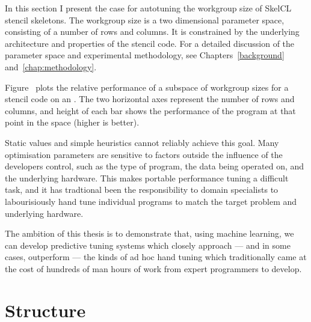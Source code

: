 In this section I present the case for autotuning the workgroup size
of SkelCL stencil skeletons. The workgroup size is a two dimensional
parameter space, consisting of a number of rows and columns. It is
constrained by the underlying architecture and properties of the
stencil code. For a detailed discussion of the parameter space and
experimental methodology, see Chapters~\ref{background}
and~\ref{chap:methodology}.

Figure~\TODO{} plots the relative performance of a subspace of
workgroup sizes for a stencil code on an \TODO{}. The two horizontal
axes represent the number of rows and columns, and height of each bar
shows the performance of the program at that point in the space
(higher is better).



Static values and simple heuristics cannot reliably achieve this
goal. Many optimisation parameters are sensitive to factors outside
the influence of the developers control, such as the type of program,
the data being operated on, and the underlying hardware. This makes
portable performance tuning a difficult task, and it has tradtional
been the responsibility to domain specialists to labourisiously hand
tune individual programs to match the target problem and underlying
hardware.

The ambition of this thesis is to demonstrate that, using machine
learning, we can develop predictive tuning systems which closely
approach --- and in some cases, outperform --- the kinds of ad hoc
hand tuning which traditionally came at the cost of hundreds of man
hours of work from expert programmers to develop.


\section{Structure}

